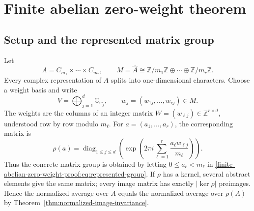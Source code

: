 \documentclass[10pt]{article}
\newcommand{\Sym}{\operatorname{Sym}}
\newcommand{\CT}{\operatorname{CT}}
\newcommand{\one}{\mathbf 1}
\begin{document}
\section{Finite abelian zero-weight theorem}\label{proof:finite-abelian}
\begingroup
{}
\providecommand{\CT}{\operatorname{CT}}
\renewcommand{\CT}{\operatorname{CT}}
\providecommand{\Sym}{\operatorname{Sym}}
\renewcommand{\Sym}{\operatorname{Sym}}
\providecommand{\Exp}{\operatorname{Exp}}
\renewcommand{\Exp}{\operatorname{Exp}}
\providecommand{\one}{\mathbf 1}
\renewcommand{\one}{\mathbf 1}
\setcounter{theorem}{0}
\setcounter{proposition}{0}
\setcounter{lemma}{0}
\setcounter{corollary}{0}
\setcounter{remark}{0}
\thispagestyle{plain}

\begin{abstract}
For a finite abelian group acting diagonally, the coefficient of the monomial
symmetric function $m_\tau$ in the sigma moment-generating function is the
number of monomial basis vectors whose total character is trivial.  This note
proves the resulting simultaneous-congruence formula, derives the diagonal
Molien average and finite constant-term form, and records a direct matrix test.
The accompanying marimo notebook constructs the represented group, builds the
full tensor product of symmetric powers, forms the Reynolds projector, and
compares its rank with an exact lattice count and a numerical character average.
\end{abstract}

\subsection{Setup and the represented matrix group}

Let
\[
 A=C_{m_1}\times\cdots\times C_{m_r},\qquad
 M=\widehat A\cong
 \mathbb Z/m_1\mathbb Z\oplus\cdots\oplus\mathbb Z/m_r\mathbb Z.
\]
Every complex representation of $A$ splits into one-dimensional characters.
Choose a weight basis and write
\[
 V=\bigoplus_{j=1}^{d}\mathbb C_{w_j},\qquad
 w_j=(w_{1j},\ldots,w_{rj})\in M.
\]
The weights are the columns of an integer matrix $W=(w_{\ell j})\in
\mathbb Z^{r\times d}$, understood row by row modulo $m_\ell$.  For
$a=(a_1,\ldots,a_r)$, the corresponding matrix is
\begin{equation}\label{finite-abelian-zero-weight-proof:eq:represented-group}
 \rho(a)=\operatorname{diag}_{1\le j\le d}
 \left(\exp\left(2\pi i\sum_{\ell=1}^{r}
 \frac{a_\ell w_{\ell j}}{m_\ell}\right)\right).
\end{equation}
Thus the concrete matrix group is obtained by letting
$0\le a_\ell<m_\ell$ in \eqref{finite-abelian-zero-weight-proof:eq:represented-group}. If $\rho$ has a
kernel, several abstract elements give the same matrix; every image matrix has
exactly $|\ker\rho|$ preimages. Hence the normalized average over $A$ equals
the normalized average over $\rho(A)$ by
Theorem~\ref{thm:normalized-image-invariance}.
\end{document}
